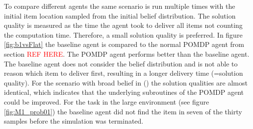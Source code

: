 To compare different agents the same scenario is run multiple times with the initial item location sampled from the initial belief distribution. The solution quality is measured as the time the agent took to deliver all items not counting the computation time. Therefore, a small solution quality is preferred. In figure \ref{fig:b1vsFlat} the baseline agent is compared to the normal POMDP agent from section \textcolor{red}{REF HERE}. The POMDP agent performs better than the baseline agent. The baseline agent does not consider the belief distribution and is not able to reason which item to deliver first, resulting in a longer delivery time (=solution quality). For the scenario with broad belief in () the solution qualities are almost identical, which indicates that the underlying subroutines of the POMDP agent could be improved. For the task in the large environment (see figure \ref{fig:M1_prob01}) the baseline agent did not find the item in seven of the thirty samples before the simulation was terminated.\\


